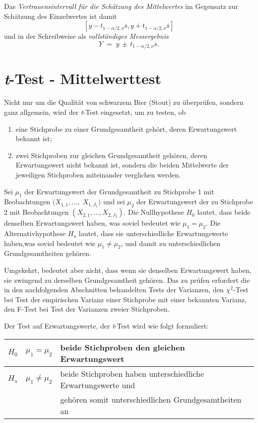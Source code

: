 Das \textsl{Vertrauensintervall für die Schätzung des Mittelwertes} im Gegensatz zur
Schätzung des Einzelwertes ist damit
$$
[y - t_{1-\alpha/2,\nu} \bar s, y + t_{1-\alpha/2,\nu} \bar s]
$$
und in der Schreibweise als \textsl{vollständiges Messergebnis}
\begin{equation}
Y \; = \; y \, \pm \, t_{1-\alpha/2,\nu} \bar s .
\label{vollstaendigesErgebMittelwert}
\end{equation}




\section{\textsl{t}-Test - Mittelwerttest}


Nicht nur um die Qualität von schwarzem Bier (Stout) zu überprüfen, sondern ganz
allgemein, wird der \textsl{t}-Test eingesetzt, um zu testen, ob
\begin{enumerate}
\item eine Stichprobe zu einer Grundgesamtheit gehört,
 deren Erwartungswert bekannt ist;
\item zwei Stichproben zur gleichen Grundgesamtheit gehören,
 deren Erwartungswert nicht bekannt ist, sondern die beiden
 Mittelwerte der jeweiligen Stichproben miteinander verglichen werden.
\end{enumerate}

Sei $\mu_1$ der Erwartungswert der Grundgesamtheit zu Stichprobe 1 mit
Beobachtungen $(X_{1,1},\dots,$ $X_{1,J_1})$ und sei $\mu_2$ der Erwartungswert der
zu Stichprobe 2 mit Beobachtungen $(X_{2,1}, \dots, X_{2,J_2})$.
Die Nullhypothese $H_0$ lautet, dass beide denselben Erwartungswert haben,
was soviel bedeutet wie $\mu_1 = \mu_2$. Die Alternativhypothese $H_\mathrm{a}$
lautet, dass sie unterschiedliche Erwartungswerte haben,was soviel bedeutet wie $\mu_1 \neq \mu_2$,
und damit zu unterschiedlichen Grundgesamtheiten gehören.

Umgekehrt, bedeutet aber nicht, dass wenn sie denselben Erwartungswert haben,
sie zwingend zu derselben Grundgesamtheit gehören. Das zu prüfen erfordert die
in den nachfolgenden Abschnitten behandelten Tests der Varianzen, den $\chi^2$-Test bei
Test der empirischen Varianz einer Stichprobe mit einer bekannten Varianz, den
F-Test bei Test der Varianzen zweier Stichproben.

Der Test auf Erwartungswerte, der \textsl{t}-Test wird wie folgt formuliert:
\begin{center}
\begin{tabular}{c|cl}
$H_0$ & $\mu_1 = \mu_2$ & beide Stichproben den gleichen Erwartungswert\\
\hline
$H_\mathrm{a}$ & $\mu_1 \neq \mu_2$ & beide Stichproben haben unterschiedliche Erwartungswerte und\\
 & & gehören somit unterschiedlichen Grundgesamtheiten an
\end{tabular}
\end{center}

